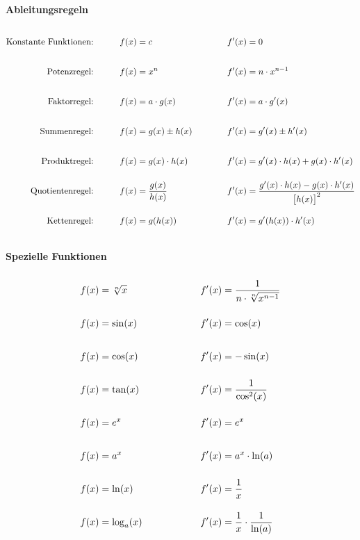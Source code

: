 \documentclass
[
  draft    = true,
  fontsize = 11pt,
  parskip  = half-,
  BCOR     = 0pt,
  DIV      = 11,
  ngerman
]
{scrartcl}
\begin{document}

\paragraph{Ableitungsregeln}
\begingroup
  \newcommand{\vstrut}{\rule[-3ex]{0pt}{7ex}}
  \begin{alignat*}{4}
    \text{Konstante Funktionen:\vstrut}     &\qquad & f(x)&=c                 & \quad&\quad & f'(x)&=0                                                          \\
    \text{Potenzregel:\vstrut}              &\qquad & f(x)&=x^{n}             & \quad&\quad & f'(x)&=n\cdot x^{n-1}                                             \\
    \text{Faktorregel:\vstrut}              &\qquad & f(x)&=a\cdot g(x)       & \quad&\quad & f'(x)&=a\cdot g'(x)                                               \\
    \text{Summenregel:\vstrut}              &\qquad & f(x)&=g(x)\pm h(x)      & \quad&\quad & f'(x)&=g'(x)\pm h'(x)                                             \\
    \text{Produktregel:\vstrut}             &\qquad & f(x)&=g(x)\cdot h(x)    & \quad&\quad & f'(x)&=g'(x)\cdot h(x)+g(x)\cdot h'(x)                            \\
    \text{Quotientenregel:\vstrut}          &\qquad & f(x)&=\frac{g(x)}{h(x)} & \quad&\quad & f'(x)&=\frac{g'(x)\cdot h(x)-g(x)\cdot h'(x)}{\big[h(x)\big]^{2}} \\
    \text{Kettenregel:\vstrut}              &\qquad & f(x)&=g(h(x))           & \quad&\quad & f'(x)&=g'(h(x))\cdot h'(x)
  \end{alignat*}
\endgroup

\paragraph{Spezielle Funktionen}
\begingroup
  \newcommand{\separator}{\qquad&\text{\rule[-3ex]{0pt}{7ex}}\qquad}
  \begin{alignat*}{3}
    f(x)&=\sqrt[n]{x} & \separator & f'(x)&=\frac{1}{n\cdot\sqrt[n]{x^{n-1}}} \\
    f(x)&=\sin(x)     & \separator & f'(x)&=\cos(x)                           \\
    f(x)&=\cos(x)     & \separator & f'(x)&=-\sin(x)                          \\
    f(x)&=\tan(x)     & \separator & f'(x)&=\frac{1}{\cos^{2}(x)}             \\
    f(x)&=e^{x}       & \separator & f'(x)&=e^{x}                             \\
    f(x)&=a^{x}       & \separator & f'(x)&=a^{x}\cdot\ln(a)                  \\
    f(x)&=\ln(x)      & \separator & f'(x)&=\frac{1}{x}                       \\
    f(x)&=\log_{a}(x) & \separator & f'(x)&=\frac{1}{x}\cdot\frac{1}{\ln(a)}
  \end{alignat*}
\endgroup

\end{document}
